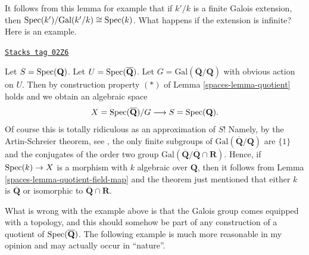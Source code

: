 It follows from this lemma for example that
if $k'/k$ is a finite Galois extension, then
$\operatorname{Spec}(k')/\text{Gal}(k'/k) \cong \operatorname{Spec}(k)$.
What happens if the extension is infinite? Here is an example.

\begin{example}[Qbar]
\label{spaces-example-Qbar}
\href{https://stacks.math.columbia.edu/tag/02Z6}{\texttt{Stacks tag 02Z6}}

Let $S = \operatorname{Spec}(\mathbf{Q})$.
Let $U = \operatorname{Spec}(\overline{\mathbf{Q}})$.
Let $G = \text{Gal}(\overline{\mathbf{Q}}/\mathbf{Q})$ with obvious
action on $U$. Then by construction property $(*)$ of
Lemma \ref{spaces-lemma-quotient} holds and we obtain an algebraic space
$$
X = \operatorname{Spec}(\overline{\mathbf{Q}})/G
\longrightarrow
S = \operatorname{Spec}(\mathbf{Q}).
$$
Of course this is totally ridiculous as an approximation of $S$!
Namely, by the Artin-Schreier theorem,
see \cite[Theorem 17, page 316]{JacobsonIII},
the only finite subgroups of $\text{Gal}(\overline{\mathbf{Q}}/\mathbf{Q})$
are $\{1\}$ and the conjugates of the order two group
$\text{Gal}(\overline{\mathbf{Q}}/\overline{\mathbf{Q}} \cap \mathbf{R})$.
Hence, if
$\operatorname{Spec}(k) \to X$ is a morphism with $k$ algebraic over $\mathbf{Q}$,
then it follows from Lemma \ref{spaces-lemma-quotient-field-map} and the theorem
just mentioned that either $k$ is $\overline{\mathbf{Q}}$ or isomorphic to
$\overline{\mathbf{Q}} \cap \mathbf{R}$.
\end{example}

What is wrong with the example above is that
the Galois group comes equipped with a topology,
and this should somehow be part of any construction
of a quotient of $\operatorname{Spec}(\overline{\mathbf{Q}})$.
The following example is much more reasonable in my opinion
and may actually occur in ``nature''.

